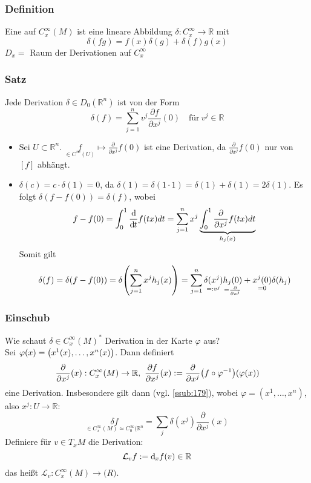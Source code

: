 \subsubsection{Definition}
\label{ssub:148}
Eine  auf $C_x^\infty (M)$ ist eine lineare Abbildung $\delta: C_x^\infty \to \mathds{R}$ mit 
\[
\delta(fg) = f(x)\delta(g) + \delta(f)g(x) \tag{Leibnitz-Regel}
\]
$D_x =$ Raum der Derivationen auf $C_x^\infty$ 

\subsubsection{Satz}
\label{ssub:149}
Jede Derivation $\delta \in D_0(\mathds{R}^n)$ ist von der Form
\[
\delta(f) = \sum_{j=1}^n v^j \frac{\partial f}{\partial x^j}(0)\quad \text{für}\ v^j\in \mathds{R}
\]
\begin{itemize}
\item Sei $U\subset \mathds{R}^n$. $\underset{\in C^\infty(U)}{f}	 \mapsto \frac{\partial}{\partial x^j}f(0)$ ist eine Derivation, da $\frac{\partial}{\partial x^j} f(0)$ nur von $[f]$ abhängt.
\item $\delta(c) = c\cdot \delta(1) = 0$, da $\delta(1) = \delta(1\cdot 1) = \delta(1) + \delta(1) = 2\delta(1)$. Es folgt $\delta(f-f(0)) = \delta(f)$, wobei
\[
f-f(0) = \int_0^1 \frac{\mathd}{\mathd t} f(tx) dt = \sum_{j=1}^n x^j \underbrace{\int_0^1 \frac{\partial}{\partial x^j} f(tx) dt}_{h_j(x)}
\]
Somit gilt
\[
\delta(f) = \delta(f-f(0)) = \delta\enbrace*{\sum_{j=1}^n x^j h_j(x)} = \sum_{j=1}^n \underset{=: v^j}{\delta(x^j)} \underset{= \frac{\partial}{\partial x^j}}{h_j(0)} + \underset{=0}{x^j(0)} \delta(h_j)
\]
\end{itemize}

\subsubsection*{Einschub}
Wie schaut $\delta\in C_x^\infty (M)^*$ Derivation in der Karte $\varphi$ aus?\\
Sei $\varphi(x) = \enbrace*{x^1(x),\ldots, x^n(x)}$. Dann definiert
\[
\frac{\partial}{\partial x^j}(x): C^\infty_x (M) \to \mathds{R},\ \frac{\partial f}{\partial x^j}(x) := \frac{\partial}{\partial x^j}\enbrace*{f\circ \varphi^{-1}}\enbrace*{\varphi(x)}
\]
eine Derivation.
Insbesondere gilt dann (vgl. \ref{ssub:179}), wobei $\varphi = (x^1,\ldots,x^n)$, also $x^j:U\to \mathds{R}$:
\[
\underset{\in C^\infty_x (M) \simeq C^\infty_0 (\mathds{R}^n}{\delta f} = \sum_j \delta(x^j) \frac{\partial}{\partial x^j}(x)
\]
Definiere für $v\in T_x M$ die Derivation:
\[
\mathcal{L}_v f := \mathd_x f(v) \in \mathds{R}
\]
das heißt $\mathcal{L}_v: C^\infty_x (M) \to \mathds(R)$.

